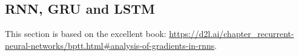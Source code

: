 \subsection{RNN, GRU and LSTM}
This section is based on the excellent book: \url{https://d2l.ai/chapter_recurrent-neural-networks/bptt.html#analysis-of-gradients-in-rnns}.

